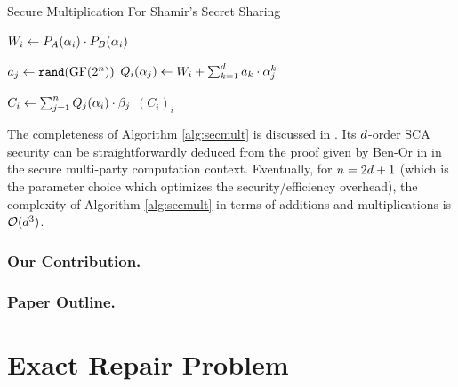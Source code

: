 \documentclass{llncs}
\begin{document}
\begin{algorithm}
\caption{Secure Multiplication For Shamir's Secret Sharing}
\label{alg:secmult}
\begin{algorithmic}[1]
\State $W_i \leftarrow P_A(\pubElt)\cdot P_{B}(\pubElt)$

\State $a_j \leftarrow \texttt{rand}(\GFn)$
\EndFor
{}
\State $Q_i(\pubElt[j]) \leftarrow W_i +
      \sum_{k=1}^{\order} a_k\cdot \pubElt[j]^k$ \label{step:reshare} 
\EndFor  	
\EndFor
   	
\State $C_i \leftarrow \sum_{j=1}^{\nbShares} Q_j(\pubElt) \cdot \beta_j$
\EndFor
\Return $(C_i)_i$
\end{algorithmic}
\end{algorithm}



The completeness of Algorithm \ref{alg:secmult} is discussed in \cite{BGW88}. Its $\order$\myth-order SCA security can be straightforwardly deduced from the proof given by Ben-Or \etal in \cite{BGW88} in the secure multi-party computation context. Eventually, for $\nbShares=2\order+1$ (which is the parameter choice which optimizes the security/efficiency overhead), the complexity of Algorithm \ref{alg:secmult} in terms of additions and multiplications is ${\cal O}(\order^3)$.
\subsubsection{Our Contribution.}
 \todo{}
\subsubsection{Paper Outline.}


\section{Exact Repair Problem}
\end{document}
